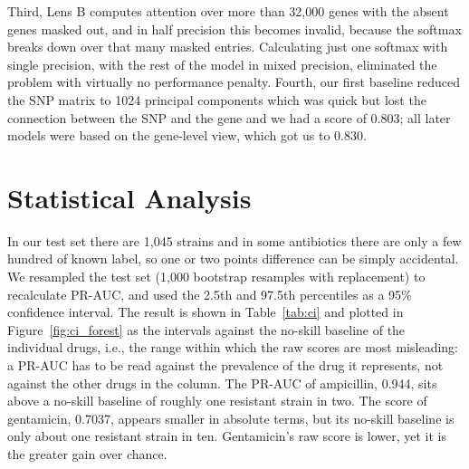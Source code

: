 \vspace{1em}

Third, Lens B computes attention over more than 32{,}000 genes with the absent
genes masked out, and in half precision this becomes invalid, because the
softmax breaks down over that many masked entries. Calculating just one softmax with single precision, with
the rest of the model in mixed precision, eliminated the problem with
virtually no performance penalty. Fourth, our first baseline reduced the SNP
matrix to 1024 principal components which was quick but lost the connection
between the SNP and the gene and we had a score of 0.803; all later models
were based on the gene-level view, which got us to 0.830.

\FloatBarrier
\section{Statistical Analysis}
\label{sec:statanalysis}

In our test set there are 1{,}045 strains and in some antibiotics there are
only a few hundred of known label, so one or two points difference can be
simply accidental. We resampled the test set (1{,}000 bootstrap resamples with
replacement) to recalculate PR-AUC, and used the 2.5th and 97.5th percentiles
as a 95\% confidence interval. The result is shown in Table~\ref{tab:ci} and
plotted in Figure~\ref{fig:ci_forest} as the intervals against the no-skill
baseline of the individual drugs, i.e., the range within which the raw scores
are most misleading: a PR-AUC has to be read against the prevalence of the
drug it represents, not against the other drugs in the column. The PR-AUC of
ampicillin, 0.944, sits above a no-skill baseline of roughly one resistant
strain in two. The score of gentamicin, 0.7037, appears smaller in absolute
terms, but its no-skill baseline is only about one resistant strain in ten.
Gentamicin's raw score is lower, yet it is the greater gain over chance.

